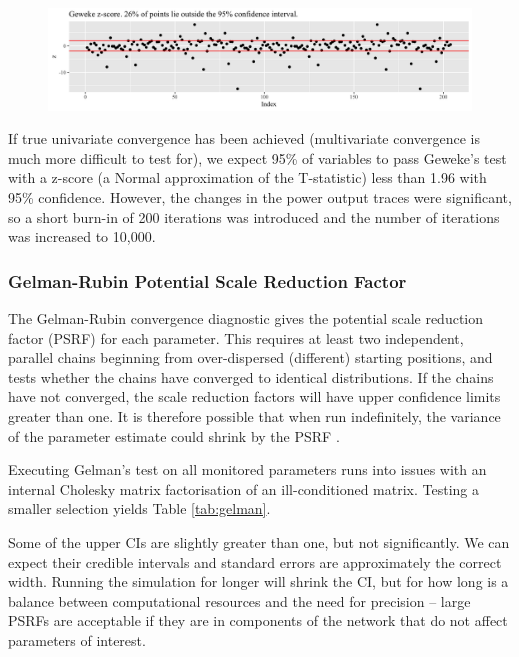 \documentclass[a4paper, 12pt]{article}
\begin{document}
\begin{figure}
  \centering
  \includegraphics[width=\linewidth]{media/geweke}
  \label{fig:geweke}
\end{figure}

If true univariate convergence has been achieved (multivariate convergence is much more difficult to test for), we expect 95\% of variables to pass Geweke's test with a z-score (a Normal approximation of the T-statistic) less than 1.96 with 95\% confidence. However, the changes in the power output traces were significant, so a short burn-in of 200 iterations was introduced and the number of iterations was increased to 10,000. 

\subsubsection{Gelman-Rubin Potential Scale Reduction Factor}
The Gelman-Rubin convergence diagnostic gives the potential scale reduction factor (PSRF) for each parameter. This requires at least two independent, parallel chains beginning from over-dispersed (different) starting positions, and tests whether the chains have converged to identical distributions. If the chains have not converged, the scale reduction factors will have upper confidence limits greater than one. It is therefore possible that when run indefinitely, the variance of the parameter estimate could shrink by the PSRF \cite{Gelman:1992}.

Executing Gelman's test on all monitored parameters runs into issues with an internal Cholesky matrix factorisation of an ill-conditioned matrix. Testing a smaller selection yields Table \ref{tab:gelman}.



Some of the upper CIs are slightly greater than one, but not significantly. We can expect their credible intervals and standard errors are approximately the correct width. Running the simulation for longer will shrink the CI, but for how long is a balance between computational resources and the need for precision -- large PSRFs are acceptable if they are in components of the network that do not affect parameters of interest.
\end{document}
